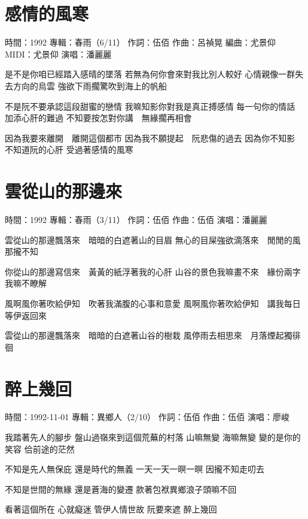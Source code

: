 \documentclass[UTF8,a4paper,oneside,twocolumn,12pt]{ctexbook}
\newcommand{\infopair}[2]{\textbullet #1：#2}
\newcommand{\zc}[1][伍佰]{\infopair{作詞}{#1}}
\newcommand{\zq}[1][伍佰]{\infopair{作曲}{#1}}
\newcommand{\bq}[1][伍佰]{\infopair{編曲}{#1}}
\newcommand{\zj}[1]{\infopair{專輯}{#1}}
\newcommand{\sj}[1]{\infopair{時間}{#1}}
\newenvironment{info}{\begin{flushleft}\kaishu
	}
	{\end{flushleft}\normalsize\yahei\par}
\newenvironment{lyric}{
	}
{}
\begin{document}
\section{感情的風寒}
\begin{info}
	\sj{1992}
	\zj{春雨（6/11）}
	\zc
	\zq[呂禎晃]
	\bq[尤景仰]
	\infopair{MIDI}{尤景仰}
	\infopair{演唱}{潘麗麗}
\end{info}
\begin{lyric}
	是不是你咱已經踏入感晴的墜落
	若無為何你會來對我比別人較好
	心情親像一群失去方向的烏雲
	強欲下雨擱驚吹到海上的帆船

	不是阮不要承認這段甜蜜的戀情
	我嘛知影你對我是真正搏感情
	每一句你的情話　加添心肝的難過
	不知要按怎對你講　無緣擱再相會

	因為我要來離開　離開這個都市
	因為我不願提起　阮悲傷的過去
	因為你不知影　不知道阮的心肝
	受過著感情的風寒
\end{lyric}

\section{雲從山的那邊來}
\begin{info}
	\sj{1992}
	\zj{春雨（3/11）}
	\zc
	\zq
	\infopair{演唱}{潘麗麗}
\end{info}
\begin{lyric}
	雲從山的那邊飄落來　暗暗的白遮著山的目眉
	無心的目屎強欲滴落來　閒閒的風那攏不知

	你從山的那邊寫信來　黃黃的紙浮著我的心肝
	山谷的景色我嘛畫不來　緣份兩字我嘛不瞭解

	風啊風你著吹給伊知　吹著我滿腹的心事和意愛
	風啊風你著吹給伊知　講我每日等伊返回來

	雲從山的那邊飄落來　暗暗的白遮著山谷的樹栽
	風停雨去相思來　月落煙起獨徘徊
\end{lyric}

\section{醉上幾回}
\begin{info}
	\sj{1992-11-01}
	\zj{異鄉人（2/10）}
	\zc
	\zq
	\infopair{演唱}{廖峻}
\end{info}
\begin{lyric}
	我踏著先人的腳步
	盤山過嶺來到這個荒蕪的村落
	山嘛無變
	海嘛無變
	變的是你的笑容
	佮前途的茫然

	不知是先人無保庇
	還是時代的無義
	一天一天一暝一暝
	因攏不知走叨去

	不知是世間的無緣
	還是蒼海的變遷
	款著包袱異鄉浪子頭嘛不回

	看著這個所在
	心就癡迷
	管伊人情世故
	阮要來遮
	醉上幾回
\end{lyric}
\end{document}
